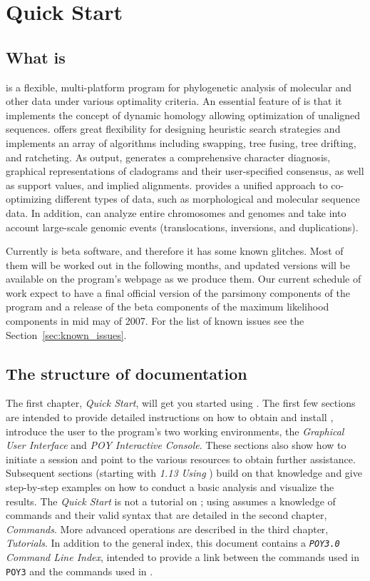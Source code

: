 \chapter{\poy Quick Start}

\section{What is \poy}

\poy is a flexible, multi-platform program for phylogenetic analysis of molecular and other data under various optimality criteria. An essential feature of \poy is that it implements the concept of dynamic homology allowing optimization of unaligned sequences. \poy offers great flexibility for designing heuristic search strategies and implements an array of algorithms including swapping, tree fusing, tree drifting, and ratcheting. As output, \poy generates a comprehensive character diagnosis, graphical representations of cladograms and their user-specified consensus, as well as support values, and implied alignments. \poy provides a unified approach to co-optimizing different types of data, such as morphological and molecular sequence data. In addition, \poy can analyze entire chromosomes and genomes and take into account large-scale genomic events (translocations, inversions, and duplications).

Currently \poy is beta software, and therefore it has some known glitches. Most
of them will be worked out in the following months, and updated versions will be
available on the program's webpage as we produce them. Our current schedule of
work expect to have a final official version of the parsimony components of the
program and a release of the beta components of the maximum
likelihood components in mid may of 2007. For the list of known issues see the
Section~\ref{sec:known_issues}.

\section{The structure of \poy documentation}
The first chapter, \emph{\poy Quick Start}, will get you started using \poy. The first few sections are intended to provide detailed instructions on how to obtain and install \poy, introduce the user to the program's two working environments, the \emph{Graphical User Interface} and \emph{POY Interactive Console}. These sections also show how to initiate a \poy session and point to the various resources to obtain further assistance. Subsequent sections (starting with \emph{1.13 Using \poy}) build on that knowledge and give step-by-step examples on how to conduct a basic analysis and visualize the results. The \emph{\poy Quick Start} is not a tutorial on \poy; using \poy assumes a knowledge of \poy commands and their valid syntax that are detailed in the second chapter, \emph{\poy Commands}. More advanced operations are described in the third chapter, \emph{\poy Tutorials}. In addition to the general index, this document contains a \emph{\texttt{POY3.0} Command Line Index}, intended to provide a link between the commands used in \texttt{POY3} and the commands used in \poy. 

